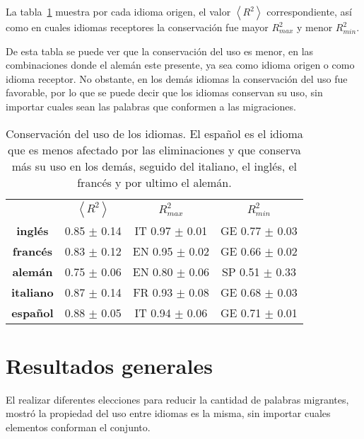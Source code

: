 La tabla~\ref{tab.conservacion} muestra por cada idioma origen,  el valor  $\left \langle R^{2}  \right \rangle$ correspondiente, así como  en cuales idiomas receptores la conservación fue mayor $R^{2}_{max}$ y menor $R^{2}_{min}$.  

De esta tabla se puede ver que la conservación del uso es menor, en las combinaciones donde el alemán este presente, ya sea como idioma origen o como idioma receptor. No obstante, en los demás idiomas la conservación del uso fue favorable, por lo que se puede decir que los idiomas conservan su uso, sin importar  cuales sean las palabras que conformen a las migraciones. 


 



\begin{table}
	\centering
	\begin{tabular}{cccc}
		\textbf{} & \textbf{$\left \langle R^{2} \right \rangle$} & \textbf{$R^{2}_{max}$} & \textbf{$R^{2}_{min}$} \\
		\textbf{inglés}   & 0.85 $\pm$ 0.14   &  IT 0.97 $\pm$ 0.01  & GE 0.77 $\pm$ 0.03  \\
		\textbf{francés}  & 0.83 $\pm$ 0.12   &  EN 0.95 $\pm$ 0.02  & GE 0.66 $\pm$ 0.02  \\
		\textbf{alemán}   & 0.75 $\pm$ 0.06   &  EN 0.80 $\pm$ 0.06  & SP 0.51 $\pm$ 0.33  \\
		\textbf{italiano} & 0.87 $\pm$ 0.14   &  FR 0.93 $\pm$ 0.08  & GE 0.68 $\pm$ 0.03  \\
		\textbf{español}  & 0.88 $\pm$ 0.05   &  IT 0.94 $\pm$ 0.06  & GE 0.71 $\pm$ 0.01                                                               
	\end{tabular}
	\caption{Conservación del uso de los idiomas. El español es el idioma que es menos afectado por las eliminaciones y que conserva más su uso en los demás, seguido del italiano, el inglés, el francés y por ultimo el alemán.}
	\label{tab.conservacion}
\end{table}





\section{Resultados generales}

El realizar diferentes elecciones para reducir la cantidad de palabras migrantes, mostró la propiedad del uso entre idiomas es la misma, sin importar cuales elementos conforman el conjunto.

